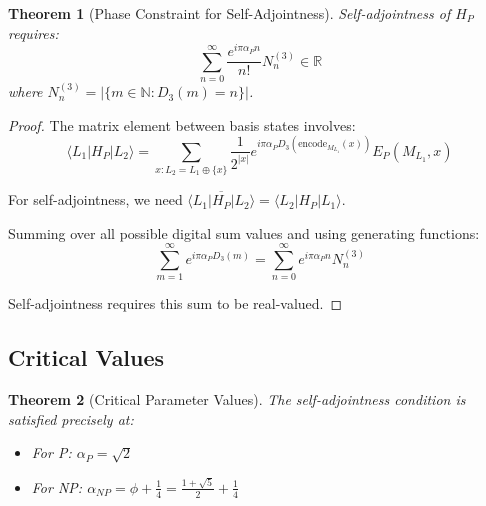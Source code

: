 \documentclass[12pt]{article}
\theoremstyle{plain}
\newtheorem{theorem}{Theorem}[section]
\theoremstyle{definition}
\newcommand{\R}{\mathbb{R}}
\newcommand{\N}{\mathbb{N}}
\newcommand{\digitalsum}{D}
\newcommand{\goldenratio}{\phi}
\newcommand{\encode}{\text{encode}}
\begin{document}
\begin{theorem}[Phase Constraint for Self-Adjointness]
\label{thm:phase_constraint}
Self-adjointness of $H_P$ requires:
\begin{equation}
\sum_{n=0}^{\infty} \frac{e^{i\pi\alpha_P n}}{n!} N_n^{(3)} \in \R
\end{equation}
where $N_n^{(3)} = |\{m \in \N : \digitalsum_3(m) = n\}|$.
\end{theorem}

\begin{proof}
The matrix element between basis states involves:
\begin{equation}
\langle L_1 | H_P | L_2 \rangle = \sum_{x: L_2 = L_1 \oplus \{x\}} \frac{1}{2^{|x|}} e^{i\pi\alpha_P \digitalsum_3(\encode_{M_{L_1}}(x))} E_P(M_{L_1}, x)
\end{equation}

For self-adjointness, we need $\overline{\langle L_1 | H_P | L_2 \rangle} = \langle L_2 | H_P | L_1 \rangle$. 

Summing over all possible digital sum values and using generating functions:
\begin{equation}
\sum_{m=1}^{\infty} e^{i\pi\alpha_P \digitalsum_3(m)} = \sum_{n=0}^{\infty} e^{i\pi\alpha_P n} N_n^{(3)}
\end{equation}

Self-adjointness requires this sum to be real-valued.
\end{proof}

\subsection{Critical Values}

\begin{theorem}[Critical Parameter Values]
\label{thm:critical_values}
The self-adjointness condition is satisfied precisely at:
\begin{itemize}
\item For P: $\alpha_P = \sqrt{2}$
\item For NP: $\alpha_{NP} = \goldenratio + \frac{1}{4} = \frac{1 + \sqrt{5}}{2} + \frac{1}{4}$
\end{itemize}
\end{theorem}
\end{document}
